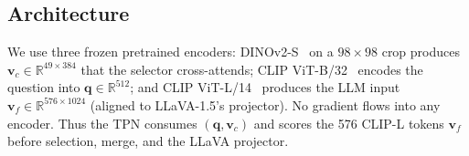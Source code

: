 \documentclass[runningheads]{llncs}
\newcommand{\vcoarse}{\mathbf{v}_{c}}
\newcommand{\vfine}{\mathbf{v}_{f}}
\newcommand{\qemb}{\mathbf{q}}
\begin{document}
\subsection{Architecture}
\label{sec:tpn}

We use three frozen pretrained encoders: DINOv2-S~\cite{oquab2023dinov2}
on a $98{\times}98$ crop produces $\vcoarse\!\in\!\mathbb{R}^{49\times 384}$
that the selector cross-attends; CLIP ViT-B/32~\cite{radford2021clip}
encodes the question into $\qemb\!\in\!\mathbb{R}^{512}$; and CLIP
ViT-L/14~\cite{radford2021clip} produces the LLM input
$\vfine\!\in\!\mathbb{R}^{576\times 1024}$ (aligned to LLaVA-1.5's
projector). No gradient flows into any encoder. Thus the TPN consumes
$(\qemb,\vcoarse)$ and scores the 576 CLIP-L tokens $\vfine$ before
selection, merge, and the LLaVA projector.
\end{document}
